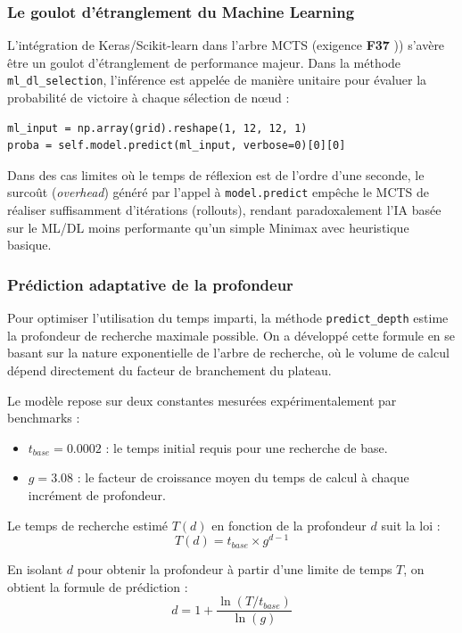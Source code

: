 \documentclass[a4paper]{article}
\begin{document}
\subsubsection{Le goulot d'étranglement du Machine Learning}
L'intégration de Keras/Scikit-learn dans l'arbre MCTS (exigence \textbf{F37} \cite{OthelloSpecs2025})) s'avère être un goulot d'étranglement de performance majeur. Dans la méthode \texttt{ml\_dl\_selection}, l'inférence est appelée de manière unitaire pour évaluer la probabilité de victoire à chaque sélection de nœud :
\begin{verbatim}
ml_input = np.array(grid).reshape(1, 12, 12, 1)
proba = self.model.predict(ml_input, verbose=0)[0][0]

\end{verbatim}
Dans des cas limites où le temps de réflexion est de l'ordre d'une seconde, le surcoût (\textit{overhead}) généré par l'appel à \texttt{model.predict} empêche le MCTS de réaliser suffisamment d'itérations (rollouts), rendant paradoxalement l'IA basée sur le ML/DL moins performante qu'un simple Minimax avec heuristique basique.

\subsubsection{Prédiction adaptative de la profondeur}

Pour optimiser l'utilisation du temps imparti, la méthode \texttt{predict\_depth} estime la profondeur de recherche maximale possible. On a développé cette formule en se basant sur la nature exponentielle de l'arbre de recherche, où le volume de calcul dépend directement du facteur de branchement du plateau.

Le modèle repose sur deux constantes mesurées expérimentalement par benchmarks :
\begin{itemize}
    \item $t_{base} = 0.0002$ : le temps initial requis pour une recherche de base.
    \item $g = 3.08$ : le facteur de croissance moyen du temps de calcul à chaque incrément de profondeur.
\end{itemize}

Le temps de recherche estimé $T(d)$ en fonction de la profondeur $d$ suit la loi :
\[ T(d) = t_{base} \times g^{d-1} \]

En isolant $d$ pour obtenir la profondeur à partir d'une limite de temps $T$, on obtient la formule de prédiction :
\[ d = 1 + \frac{\ln(T / t_{base})}{\ln(g)} \]
\end{document}
